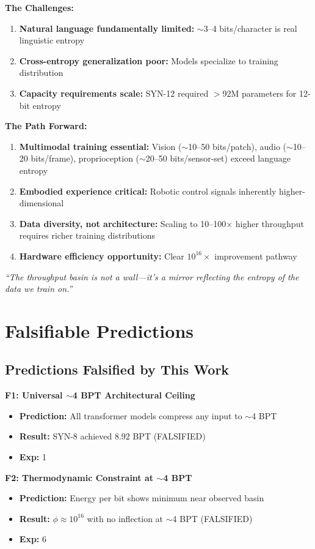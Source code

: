 \documentclass[11pt,a4paper]{article}
\begin{document}
\textbf{The Challenges:}
\begin{enumerate}
\item \textbf{Natural language fundamentally limited:} $\sim$3--4 bits/character is real linguistic entropy
\item \textbf{Cross-entropy generalization poor:} Models specialize to training distribution
\item \textbf{Capacity requirements scale:} SYN-12 required $>$92M parameters for 12-bit entropy
\end{enumerate}

\textbf{The Path Forward:}
\begin{enumerate}
\item \textbf{Multimodal training essential:} Vision ($\sim$10--50 bits/patch), audio ($\sim$10--20 bits/frame), proprioception ($\sim$20--50 bits/sensor-set) exceed language entropy
\item \textbf{Embodied experience critical:} Robotic control signals inherently higher-dimensional
\item \textbf{Data diversity, not architecture:} Scaling to 10--100$\times$ higher throughput requires richer training distributions
\item \textbf{Hardware efficiency opportunity:} Clear $10^{16}\times$ improvement pathway
\end{enumerate}

\textit{``The throughput basin is not a wall---it's a mirror reflecting the entropy of the data we train on.''}

\section{Falsifiable Predictions}

\subsection{Predictions Falsified by This Work}

\textbf{F1: Universal $\sim$4 BPT Architectural Ceiling}
\begin{itemize}
\item \textbf{Prediction:} All transformer models compress any input to $\sim$4 BPT
\item \textbf{Result:} SYN-8 achieved 8.92 BPT (FALSIFIED)
\item \textbf{Exp:} 1
\end{itemize}

\textbf{F2: Thermodynamic Constraint at $\sim$4 BPT}
\begin{itemize}
\item \textbf{Prediction:} Energy per bit shows minimum near observed basin
\item \textbf{Result:} $\phi \approx 10^{16}$ with no inflection at $\sim$4 BPT (FALSIFIED)
\item \textbf{Exp:} 6
\end{itemize}
\end{document}
